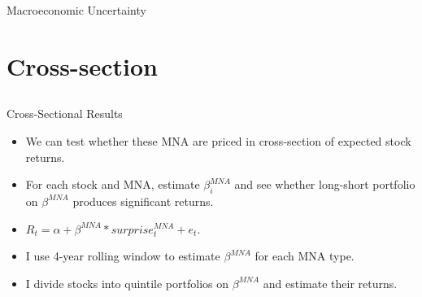 \documentclass{beamer}
\begin{document}
\begin{frame}{Macroeconomic Uncertainty}
\centering
\vspace{-0.1cm}
\end{frame}


\section{Cross-section}
\subsection{}

\begin{frame}{Cross-Sectional Results}
\begin{itemize}
    \item {We can test whether these MNA are priced in cross-section of expected stock returns.}
    \item {For each stock and MNA, estimate $\beta_i^{MNA}$ and see whether long-short portfolio on $\beta^{MNA}$ produces significant returns.}
    \item {$R_t = \alpha + \beta^{MNA}* surprise_t^{MNA}+e_t$.}
    \item {I use 4-year rolling window to estimate $\beta^{MNA}$ for each MNA type.}
    \item {I divide stocks into quintile portfolios on $\beta^{MNA}$ and estimate their returns.}
\end{itemize}
\end{frame}
\end{document}

